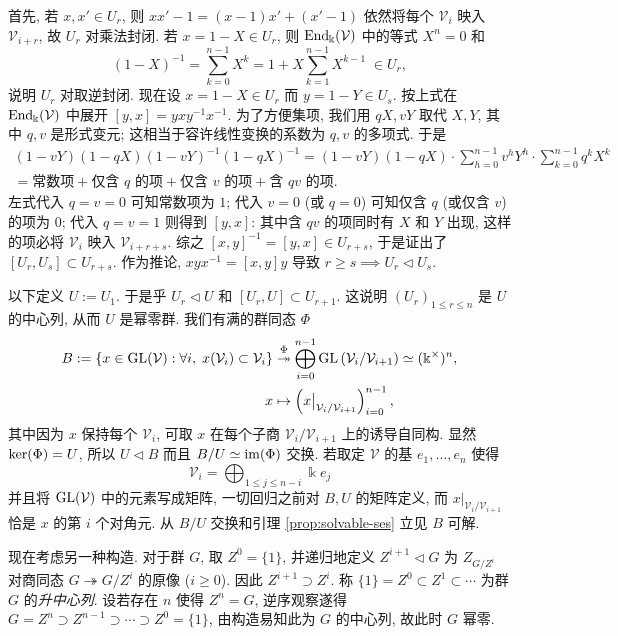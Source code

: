 \begin{example}
	首先, 若 $x, x' \in U_r$, 则 $xx' - 1 = (x-1)x' + (x'-1)$ 依然将每个 $\mathcal{V}_i$ 映入 $\mathcal{V}_{i+r}$, 故 $U_r$ 对乘法封闭. 若 $x = 1-X \in U_r$, 则 $\operatorname{End}_\Bbbk(\mathcal{V})$ 中的等式 $X^n=0$ 和
	\[ (1-X)^{-1} = \sum_{k=0}^{n-1} X^k = 1 + X \sum_{k=1}^{n-1} X^{k-1} \; \in U_r, \]
	说明 $U_r$ 对取逆封闭. 现在设 $x = 1-X \in U_r$ 而 $y = 1-Y \in U_s$. 按上式在 $\operatorname{End}_\Bbbk(\mathcal{V})$ 中展开 $[y,x] = y x y^{-1} x^{-1}$. 为了方便集项, 我们用 $qX, vY$ 取代 $X, Y$, 其中 $q,v$ 是形式变元; 这相当于容许线性变换的系数为 $q,v$ 的多项式. 于是
	\begin{multline*}
		(1-vY) (1-qX) (1-vY)^{-1} (1-qX)^{-1} = (1-vY) (1-qX) \cdot \sum_{h=0}^{n-1} v^h Y^h \cdot \sum_{k=0}^{n-1} q^k X^k \\
		= \text{常数项} + \text{仅含 $q$ 的项} + \text{仅含 $v$ 的项} + \text{含 $qv$ 的项}.
	\end{multline*}
	左式代入 $q=v=0$ 可知常数项为 $1$; 代入 $v=0$ (或 $q=0$) 可知仅含 $q$ (或仅含 $v$) 的项为 $0$; 代入 $q=v=1$ 则得到 $[y,x]$: 其中含 $qv$ 的项同时有 $X$ 和 $Y$ 出现, 这样的项必将 $\mathcal{V}_i$ 映入 $\mathcal{V}_{i+r+s}$. 综之 $[x,y]^{-1} = [y,x] \in U_{r+s}$, 于是证出了 $[U_r, U_s] \subset U_{r+s}$. 作为推论, $xyx^{-1} = [x,y]y$ 导致 $r \geq s \implies U_r \lhd U_s$.
	
	以下定义 $U := U_1$. 于是乎 $U_r \lhd U$ 和 $[U_r, U] \subset U_{r+1}$. 这说明 $(U_r)_{1 \leq r \leq n}$ 是 $U$ 的中心列, 从而 $U$ 是幂零群. 我们有满的群同态 $\Phi$
	\begin{align*}
		B := \left\{ x \in \operatorname{GL}(\mathcal{V}): \forall i, \; x (\mathcal{V}_i) \subset \mathcal{V}_i \right\} & \stackrel{\Phi}{\twoheadrightarrow} \bigoplus_{i=0}^{n-1} \operatorname{GL}\left( \mathcal{V}_i/\mathcal{V}_{i+1} \right) \simeq (\Bbbk^\times)^n, \\
		x & \mapsto \left( x \big|_{\mathcal{V}_i/\mathcal{V}_{i+1}} \right)_{i=0}^{n-1} ,
	\end{align*}
	其中因为 $x$ 保持每个 $\mathcal{V}_i$, 可取 $x$ 在每个子商 $\mathcal{V}_i/\mathcal{V}_{i+1}$ 上的诱导自同构. 显然 $\operatorname{ker}(\Phi) = U$, 所以 $U \lhd B$ 而且 $B/U \simeq \operatorname{im}(\Phi)$ 交换. 若取定 $\mathcal{V}$ 的基 $e_1, \ldots, e_n$ 使得
	\[ \mathcal{V}_i = \bigoplus_{1 \leq j \leq n-i} \Bbbk e_j \]
	并且将 $\operatorname{GL}(\mathcal{V})$ 中的元素写成矩阵, 一切回归之前对 $B, U$ 的矩阵定义, 而 $x|_{\mathcal{V}_i/\mathcal{V}_{i+1}}$ 恰是 $x$ 的第 $i$ 个对角元. 从 $B/U$ 交换和引理 \ref{prop:solvable-ses} 立见 $B$ 可解.
\end{example}

现在考虑另一种构造. 对于群 $G$, 取 $Z^0 = \{1\}$, 并递归地定义 $Z^{i+1} \lhd G$ 为 $Z_{G/Z^i}$ 对商同态 $G \twoheadrightarrow G/Z^i$ 的原像 ($i \geq 0$). 因此 $Z^{i+1} \supset Z^i$. 称 $\{1\} = Z^0 \subset Z^1 \subset \cdots $ 为群 $G$ 的\emph{升中心列}. 设若存在 $n$ 使得 $Z^n = G$, 逆序观察遂得 $G = Z^n \supset Z^{n-1} \supset \cdots \supset Z^0 = \{1\}$, 由构造易知此为 $G$ 的中心列, 故此时 $G$ 幂零.

